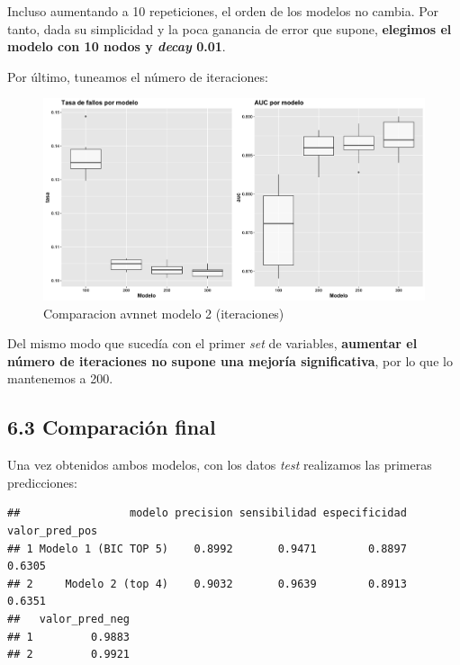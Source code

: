 \documentclass[
]{article}
\begin{document}
Incluso aumentando a 10 repeticiones, el orden de los modelos no cambia.
Por tanto, dada su simplicidad y la poca ganancia de error que supone,
\textbf{elegimos el modelo con 10 nodos y \emph{decay} 0.01}.

Por último, tuneamos el número de iteraciones:

\begin{figure}[h!]

{\centering \includegraphics[width=0.99\linewidth,height=0.99\textheight,]{./charts/02_comparacion_tasa_auc_modelo2_10rep_iters} 

}

\caption{Comparacion avnnet modelo 2 (iteraciones)}\label{fig:unnamed-chunk-60}
\end{figure}

Del mismo modo que sucedía con el primer \emph{set} de variables,
\textbf{aumentar el número de iteraciones no supone una mejoría
significativa}, por lo que lo mantenemos a 200.

\hypertarget{comparaciuxf3n-final}{%
\subsection{6.3 Comparación final}\label{comparaciuxf3n-final}}

Una vez obtenidos ambos modelos, con los datos \emph{test} realizamos
las primeras predicciones:

\begin{verbatim}
##                 modelo precision sensibilidad especificidad valor_pred_pos
## 1 Modelo 1 (BIC TOP 5)    0.8992       0.9471        0.8897         0.6305
## 2     Modelo 2 (top 4)    0.9032       0.9639        0.8913         0.6351
##   valor_pred_neg
## 1         0.9883
## 2         0.9921
\end{verbatim}
\end{document}
